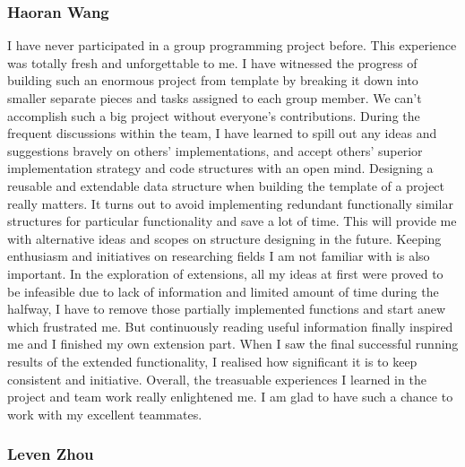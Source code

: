 \documentclass[11pt]{article}
\begin{document}
\subsubsection{Haoran Wang}

I have never participated in a group programming project before. This experience was totally fresh and unforgettable to me. I have witnessed the progress of building such an enormous project from template by breaking it down into smaller separate pieces and tasks assigned to each group member. We can’t accomplish such a big project without everyone’s contributions. During the frequent discussions within the team, I have learned to spill out any ideas and suggestions bravely on others’ implementations, and accept others’ superior implementation strategy and code structures with an open mind. Designing a reusable and extendable data structure when building the template of a project really matters. It turns out to avoid implementing redundant functionally similar structures for particular functionality and save a lot of time. This will provide me with alternative ideas and scopes on structure designing in the future. Keeping enthusiasm and initiatives on researching fields I am not familiar with is also important. In the exploration of extensions, all my ideas at first were proved to be infeasible due to lack of information and limited amount of time during the halfway, I have to remove those partially implemented functions and start anew which frustrated me. But continuously reading useful information finally inspired me and I finished my own extension part. When I saw the final successful running results of the extended functionality, I realised how significant it is to keep consistent and initiative. Overall, the treasuable experiences I learned in the project and team work really enlightened me. I am glad to have such a chance to work with my excellent teammates.

\subsubsection{Leven Zhou}
\end{document}
